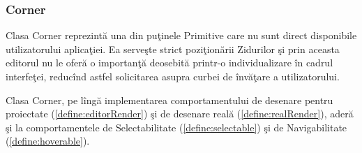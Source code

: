 \subsubsection{Corner}

Clasa Corner reprezintă una din puţinele Primitive care nu sunt direct
disponibile utilizatorului aplicaţiei. Ea serveşte strict poziţionării Zidurilor
şi prin aceasta editorul nu le oferă o importanţă deosebită printr-o
individualizare în cadrul interfeţei, reducînd astfel solicitarea asupra curbei
de învăţare a utilizatorului.

Clasa Corner, pe lîngă implementarea comportamentului de desenare pentru
proiectate (\ref{define:editorRender}) şi de desenare reală
(\ref{define:realRender}), aderă şi la comportamentele de Selectabilitate
(\ref{define:selectable}) şi de Navigabilitate (\ref{define:hoverable}).
